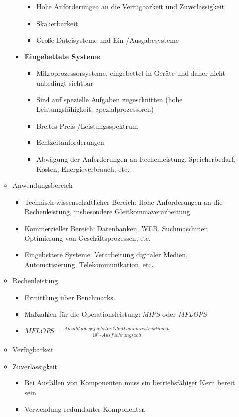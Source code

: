 \begin{itemize}
\begin{itemize}
\begin{itemize}
\begin{itemize}
				\item Hohe Anforderungen an die Verfügbarkeit und Zuverlässigkeit
				\item Skalierbarkeit
				\item Große Dateisysteme und Ein-/Ausgabesysteme
			\end{itemize}
			\item \textbf{Eingebettete Systeme}
			\begin{itemize}
				\item Mikroprozessorsysteme, eingebettet in Geräte und daher nicht unbedingt sichtbar
				\item Sind auf spezielle Aufgaben zugeschnitten (hohe Leistungsfähigkeit, Spezialprozessoren)
				\item Breites Preis-/Leistungsspektrum
				\item Echtzeitanforderungen
				\item Abwägung der Anforderungen an Rechenleistung, Speicherbedarf, Kosten, Energieverbrauch, etc.
			\end{itemize}
		\end{itemize}
		\item Anwendungsbereich
		\begin{itemize}
			\item Technisch-wissenschaftlicher Bereich: Hohe Anforderungen an die Rechenleistung, insbesondere Gleitkommaverarbeitung
			\item Kommerzieller Bereich: Datenbanken, WEB, Suchmaschinen, Optimierung von Geschäftsprozessen, etc.
			\item Eingebettete Systeme: Verarbeitung digitaler Medien, Automatisierung, Telekommunikation, etc.
		\end{itemize}
		\item Rechenleistung
		\begin{itemize}
			\item Ermittlung über Benchmarks
			\item Maßzahlen für die Operationsleistung: \textit{MIPS} oder \textit{MFLOPS}
			\item \(MFLOPS = \frac{Anzahl~ausgefuehrter~Gleitkommainstruktionen}{10^6 \cdot Ausfuehrungszeit}\)
		\end{itemize}
		\item Verfügbarkeit
		\item Zuverlässigkeit
		\begin{itemize}
			\item Bei Ausfällen von Komponenten muss ein betriebsfähiger Kern bereit sein
			\item Verwendung redundanter Komponenten

\end{itemize}
\end{itemize}
\end{itemize}
